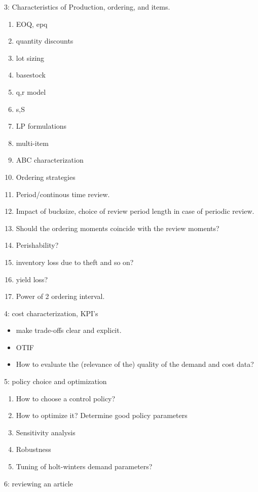 3: Characteristics of Production, ordering, and items.
\begin{enumerate}
\item EOQ, epq
\item quantity discounts
\item lot sizing
\item basestock
\item q,r model
\item s,S 
\item LP formulations
\item multi-item
\item ABC characterization
\item Ordering strategies
\item Period/continous time review.
\item Impact of bucksize, choice of review period length in case of periodic review.
\item Should the ordering moments coincide with the review moments?
\item Perishability? 
\item inventory loss due to theft and so on?
\item yield loss?
\item Power of 2 ordering interval.
\end{enumerate}

4: cost characterization, KPI's
\begin{itemize}
\item make  trade-offs clear and explicit.
\item OTIF
\item How to evaluate the (relevance of the) quality of the demand and cost data? 
\end{itemize}


5: policy choice and optimization
\begin{enumerate}
\item How to choose a control policy?
\item How to optimize it?  Determine good policy parameters
\item Sensitivity analysis
\item Robustness
\item Tuning of holt-winters demand parameters?
\end{enumerate}

6: reviewing an article


